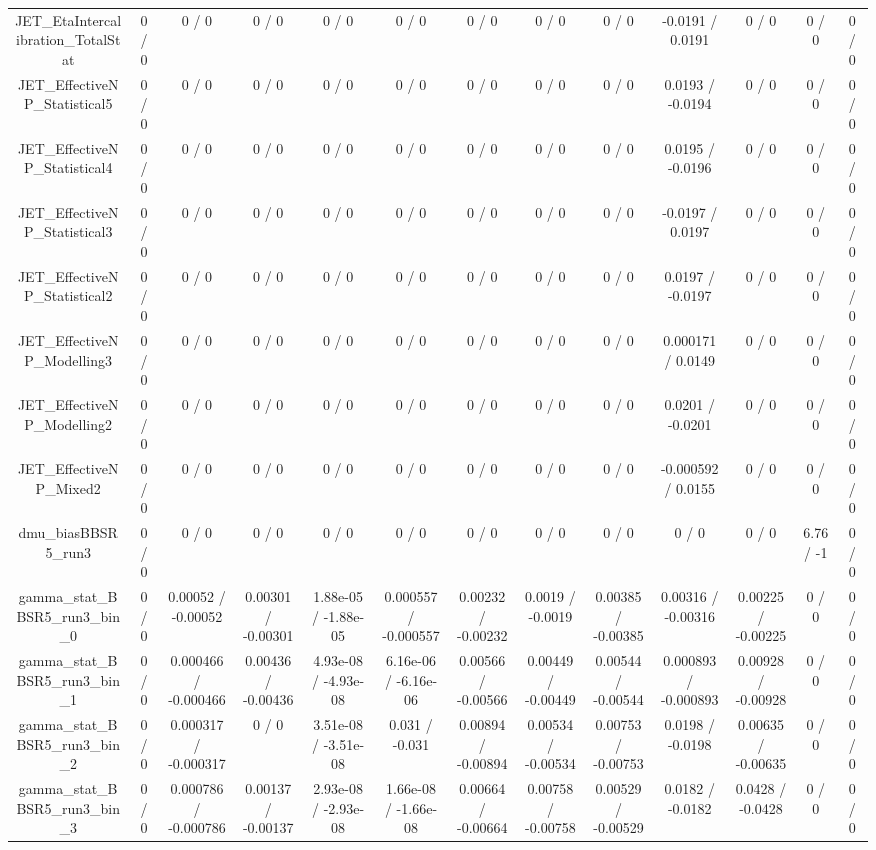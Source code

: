\documentclass[10pt]{article}
\begin{document}
\begin{table}[htbp]
\begin{center}
\begin{tabular}{|c|c|c|c|c|c|c|c|c|c|c|c|c|}
  JET_EtaIntercalibration_TotalStat & 0 / 0 & 0 / 0 & 0 / 0 & 0 / 0 & 0 / 0 & 0 / 0 & 0 / 0 & 0 / 0 & -0.0191 / 0.0191 & 0 / 0 & 0 / 0 & 0 / 0 \\ 
  JET_EffectiveNP_Statistical5 & 0 / 0 & 0 / 0 & 0 / 0 & 0 / 0 & 0 / 0 & 0 / 0 & 0 / 0 & 0 / 0 & 0.0193 / -0.0194 & 0 / 0 & 0 / 0 & 0 / 0 \\ 
  JET_EffectiveNP_Statistical4 & 0 / 0 & 0 / 0 & 0 / 0 & 0 / 0 & 0 / 0 & 0 / 0 & 0 / 0 & 0 / 0 & 0.0195 / -0.0196 & 0 / 0 & 0 / 0 & 0 / 0 \\ 
  JET_EffectiveNP_Statistical3 & 0 / 0 & 0 / 0 & 0 / 0 & 0 / 0 & 0 / 0 & 0 / 0 & 0 / 0 & 0 / 0 & -0.0197 / 0.0197 & 0 / 0 & 0 / 0 & 0 / 0 \\ 
  JET_EffectiveNP_Statistical2 & 0 / 0 & 0 / 0 & 0 / 0 & 0 / 0 & 0 / 0 & 0 / 0 & 0 / 0 & 0 / 0 & 0.0197 / -0.0197 & 0 / 0 & 0 / 0 & 0 / 0 \\ 
  JET_EffectiveNP_Modelling3 & 0 / 0 & 0 / 0 & 0 / 0 & 0 / 0 & 0 / 0 & 0 / 0 & 0 / 0 & 0 / 0 & 0.000171 / 0.0149 & 0 / 0 & 0 / 0 & 0 / 0 \\ 
  JET_EffectiveNP_Modelling2 & 0 / 0 & 0 / 0 & 0 / 0 & 0 / 0 & 0 / 0 & 0 / 0 & 0 / 0 & 0 / 0 & 0.0201 / -0.0201 & 0 / 0 & 0 / 0 & 0 / 0 \\ 
  JET_EffectiveNP_Mixed2 & 0 / 0 & 0 / 0 & 0 / 0 & 0 / 0 & 0 / 0 & 0 / 0 & 0 / 0 & 0 / 0 & -0.000592 / 0.0155 & 0 / 0 & 0 / 0 & 0 / 0 \\ 
  dmu_biasBBSR5_run3 & 0 / 0 & 0 / 0 & 0 / 0 & 0 / 0 & 0 / 0 & 0 / 0 & 0 / 0 & 0 / 0 & 0 / 0 & 0 / 0 & 6.76 / -1 & 0 / 0 \\ 
  gamma_stat_BBSR5_run3_bin_0 & 0 / 0 & 0.00052 / -0.00052 & 0.00301 / -0.00301 & 1.88e-05 / -1.88e-05 & 0.000557 / -0.000557 & 0.00232 / -0.00232 & 0.0019 / -0.0019 & 0.00385 / -0.00385 & 0.00316 / -0.00316 & 0.00225 / -0.00225 & 0 / 0 & 0 / 0 \\ 
  gamma_stat_BBSR5_run3_bin_1 & 0 / 0 & 0.000466 / -0.000466 & 0.00436 / -0.00436 & 4.93e-08 / -4.93e-08 & 6.16e-06 / -6.16e-06 & 0.00566 / -0.00566 & 0.00449 / -0.00449 & 0.00544 / -0.00544 & 0.000893 / -0.000893 & 0.00928 / -0.00928 & 0 / 0 & 0 / 0 \\ 
  gamma_stat_BBSR5_run3_bin_2 & 0 / 0 & 0.000317 / -0.000317 & 0 / 0 & 3.51e-08 / -3.51e-08 & 0.031 / -0.031 & 0.00894 / -0.00894 & 0.00534 / -0.00534 & 0.00753 / -0.00753 & 0.0198 / -0.0198 & 0.00635 / -0.00635 & 0 / 0 & 0 / 0 \\ 
  gamma_stat_BBSR5_run3_bin_3 & 0 / 0 & 0.000786 / -0.000786 & 0.00137 / -0.00137 & 2.93e-08 / -2.93e-08 & 1.66e-08 / -1.66e-08 & 0.00664 / -0.00664 & 0.00758 / -0.00758 & 0.00529 / -0.00529 & 0.0182 / -0.0182 & 0.0428 / -0.0428 & 0 / 0 & 0 / 0 \\ 

\end{tabular}
\end{center}
\end{table}
\end{document}
